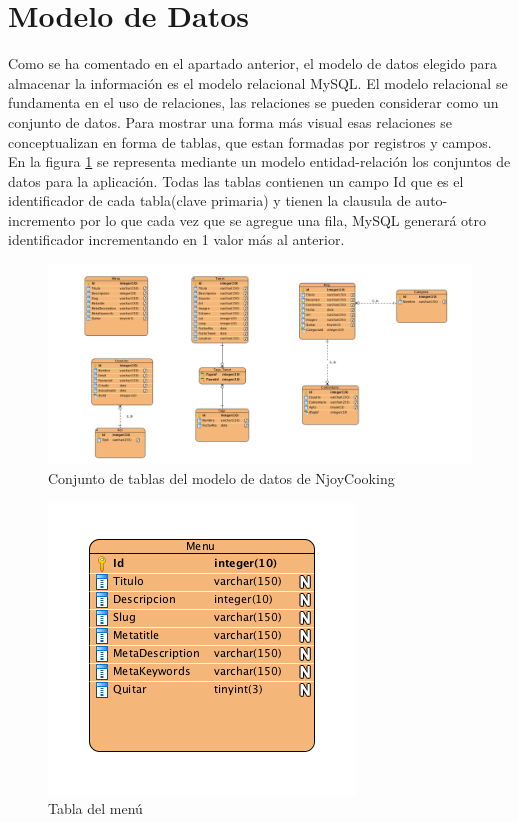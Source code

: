 \section{Modelo de Datos}

Como se ha comentado en el apartado anterior, el modelo de datos elegido para almacenar la información es el modelo relacional MySQL.
El modelo relacional se fundamenta en el uso de relaciones, las relaciones se pueden considerar como un conjunto de datos.
Para mostrar una forma más visual esas relaciones se conceptualizan en forma de tablas, que estan formadas por registros y campos. En la figura \ref{tablas_bd}
se representa mediante un modelo entidad-relación los conjuntos de datos para la aplicación. Todas las tablas contienen un campo Id que es el identificador de
cada tabla(clave primaria) y tienen la clausula de auto-incremento por lo que cada vez que se agregue una fila, MySQL generará otro identificador
incrementando en 1 valor más al anterior.


\begin{figure}
\begin{center}
\includegraphics[width=1.0\textwidth]{imagenes/E-R.png}
\caption{Conjunto de tablas del modelo de datos de NjoyCooking}
\label{tablas_bd}
\end{center}
\end{figure}

\begin{figure}
\begin{center}
\includegraphics[scale=0.7]{imagenes/menu.png}
\caption{Tabla del menú}
\label{menu_bd}
\end{center}
\end{figure}

